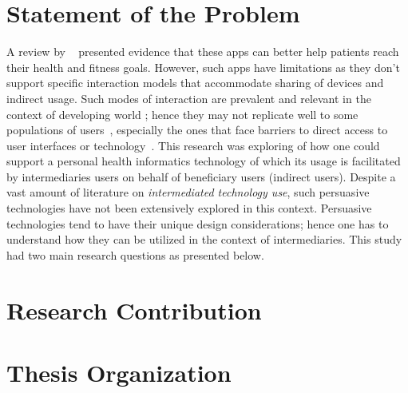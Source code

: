 \section{Statement of the Problem}
A review by ~\cite{higgins2016smartphone} presented evidence that these apps can better help patients reach their health and fitness goals.
However, such apps have limitations as they don't support specific interaction models that accommodate sharing of devices and indirect usage. Such modes of interaction are prevalent and relevant in the context of developing world ; hence they may not replicate well to some populations of users~\citep{kaplan2006can,sambasivan2010}, especially the ones that face barriers to direct access to user interfaces or technology~\citep{kumar2015mobile}. This research was exploring of how one could support a personal health informatics technology of which its usage is facilitated by intermediaries users on behalf of beneficiary users (indirect users). Despite a vast amount of literature on \emph{intermediated technology use}, such persuasive technologies have not been extensively explored in this context. Persuasive technologies tend to have their unique design considerations; hence one has to understand how they can be utilized in the context of intermediaries. This study had two main research questions as presented below. 
\section{Research Contribution}
\section{Thesis Organization}

\begin{flushright}
\end{flushright}
